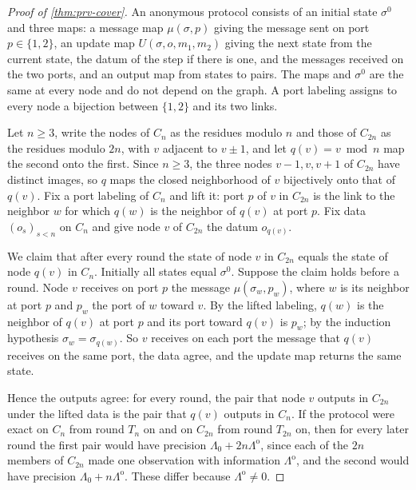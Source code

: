 \begin{proof}[Proof of \cref{thm:prv-cover}]
An anonymous protocol consists of an initial state $\sigma^0$ and three maps: a message map $\mu(\sigma,p)$ giving the message sent on port $p\in\{1,2\}$, an update map $U(\sigma,o,m_1,m_2)$ giving the next state from the current state, the datum of the step if there is one, and the messages received on the two ports, and an output map from states to pairs. The maps and $\sigma^0$ are the same at every node and do not depend on the graph. A port labeling assigns to every node a bijection between $\{1,2\}$ and its two links.

Let $n\ge3$, write the nodes of $C_n$ as the residues modulo $n$ and those of $C_{2n}$ as the residues modulo $2n$, with $v$ adjacent to $v\pm1$, and let $q(v)=v\bmod n$ map the second onto the first. Since $n\ge3$, the three nodes $v-1,v,v+1$ of $C_{2n}$ have distinct images, so $q$ maps the closed neighborhood of $v$ bijectively onto that of $q(v)$. Fix a port labeling of $C_n$ and lift it: port $p$ of $v$ in $C_{2n}$ is the link to the neighbor $w$ for which $q(w)$ is the neighbor of $q(v)$ at port $p$. Fix data $(o_s)_{s<n}$ on $C_n$ and give node $v$ of $C_{2n}$ the datum $o_{q(v)}$.

We claim that after every round the state of node $v$ in $C_{2n}$ equals the state of node $q(v)$ in $C_n$. Initially all states equal $\sigma^0$. Suppose the claim holds before a round. Node $v$ receives on port $p$ the message $\mu(\sigma_w,p_w)$, where $w$ is its neighbor at port $p$ and $p_w$ the port of $w$ toward $v$. By the lifted labeling, $q(w)$ is the neighbor of $q(v)$ at port $p$ and its port toward $q(v)$ is $p_w$; by the induction hypothesis $\sigma_w=\sigma_{q(w)}$. So $v$ receives on each port the message that $q(v)$ receives on the same port, the data agree, and the update map returns the same state.

Hence the outputs agree: for every round, the pair that node $v$ outputs in $C_{2n}$ under the lifted data is the pair that $q(v)$ outputs in $C_n$. If the protocol were exact on $C_n$ from round $T_n$ on and on $C_{2n}$ from round $T_{2n}$ on, then for every later round the first pair would have precision $\Lambda_0+2n\Lambda^{\mathrm o}$, since each of the $2n$ members of $C_{2n}$ made one observation with information $\Lambda^{\mathrm o}$, and the second would have precision $\Lambda_0+n\Lambda^{\mathrm o}$. These differ because $\Lambda^{\mathrm o}\ne0$.
\end{proof}

